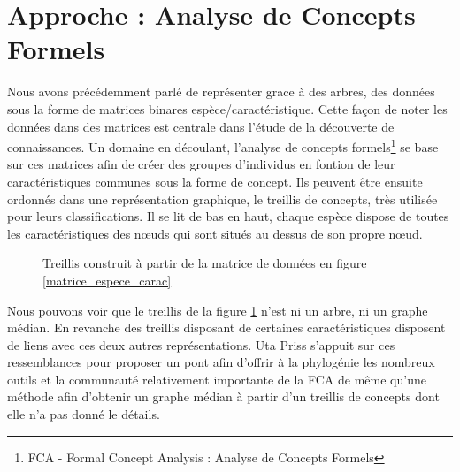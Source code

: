 \section{Approche : Analyse de Concepts Formels}

Nous avons précédemment parlé de représenter grace à des arbres, des données sous la forme de matrices binares espèce/caractéristique. Cette façon de noter les données dans des matrices est centrale dans l'étude de la découverte de connaissances. Un domaine en découlant, l'analyse de concepts formels\footnote{FCA - Formal Concept Analysis : Analyse de Concepts Formels} se base sur ces matrices afin de créer des groupes d'individus en fontion de leur caractéristiques communes sous la forme de concept. Ils peuvent être ensuite ordonnés dans une représentation graphique, le treillis de concepts, très utilisée pour leurs classifications. Il se lit de bas en haut, chaque espèce dispose de toutes les caractéristiques des n\oe uds qui sont situés au dessus de son propre n\oe ud.

\begin{figure}[H]
	\begin{center}
	\end{center}
	\caption{Treillis construit à partir de la matrice de données en figure \ref{matrice_espece_carac}}
	\label{treillis_exemple}
\end{figure}

Nous pouvons voir que le treillis de la figure \ref{treillis_exemple} n'est ni un arbre, ni un graphe médian. En revanche des treillis disposant de certaines caractéristiques disposent de liens avec ces deux autres représentations. Uta Priss s'appuit sur ces ressemblances pour proposer un pont afin d'offrir à la phylogénie les nombreux outils et la communauté relativement importante de la FCA de même qu'une méthode afin d'obtenir un graphe médian à partir d'un treillis de concepts dont elle n'a pas donné le détails.

